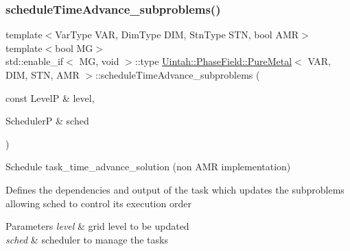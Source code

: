 \subsubsection{\texorpdfstring{schedule\+Time\+Advance\+\_\+subproblems()}{scheduleTimeAdvance\_subproblems()}\hspace{0.1cm}{\footnotesize\ttfamily [1/2]}}
{\footnotesize\ttfamily template$<$Var\+Type V\+AR, Dim\+Type D\+IM, Stn\+Type S\+TN, bool A\+MR$>$ \\
template$<$bool MG$>$ \\
std\+::enable\+\_\+if$<$ MG, void $>$\+::type \hyperlink{classUintah_1_1PhaseField_1_1PureMetal}{Uintah\+::\+Phase\+Field\+::\+Pure\+Metal}$<$ V\+AR, D\+IM, S\+TN, A\+MR $>$\+::schedule\+Time\+Advance\+\_\+subproblems (\begin{DoxyParamCaption}\item[{const LevelP \&}]{level,  }\item[{SchedulerP \&}]{sched }\end{DoxyParamCaption})\hspace{0.3cm}{\ttfamily [protected]}}



Schedule task\+\_\+time\+\_\+advance\+\_\+solution (non A\+MR implementation) 

Defines the dependencies and output of the task which updates the subproblems allowing sched to control its execution order


\begin{DoxyParams}{Parameters}
{\em level} & grid level to be updated \\
\hline
{\em sched} & scheduler to manage the tasks \\
\hline
\end{DoxyParams}
\mbox{\label{classUintah_1_1PhaseField_1_1PureMetal_a343b51c59a68cb107d449d16f4857c1e}} 

